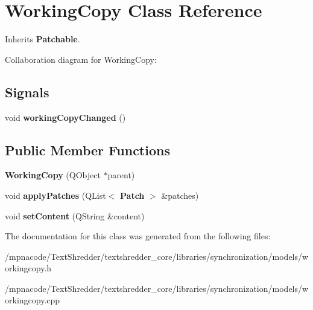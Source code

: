 \section{WorkingCopy Class Reference}
\label{class_working_copy}


Inherits {\bf Patchable}.



Collaboration diagram for WorkingCopy:
\subsection*{Signals}
\begin{DoxyCompactItemize}
\item 
void {\bfseries workingCopyChanged} ()\label{class_working_copy_a6f429f4859aa432ab3f2adf178096b2a}

\end{DoxyCompactItemize}
\subsection*{Public Member Functions}
\begin{DoxyCompactItemize}
\item 
{\bfseries WorkingCopy} (QObject $\ast$parent)\label{class_working_copy_a1e6a6d8fd29aba4234fb90f842cf9ea1}

\item 
void {\bfseries applyPatches} (QList$<$ {\bf Patch} $>$ \&patches)\label{class_working_copy_a69785100266e5bdb9324dae3eb1349f7}

\item 
void {\bfseries setContent} (QString \&content)\label{class_working_copy_a4d7ff4140fe2d93c28f8275f6512d6c3}

\end{DoxyCompactItemize}


The documentation for this class was generated from the following files:\begin{DoxyCompactItemize}
\item 
/mpnacode/TextShredder/textshredder\_\-core/libraries/synchronization/models/workingcopy.h\item 
/mpnacode/TextShredder/textshredder\_\-core/libraries/synchronization/models/workingcopy.cpp\end{DoxyCompactItemize}
